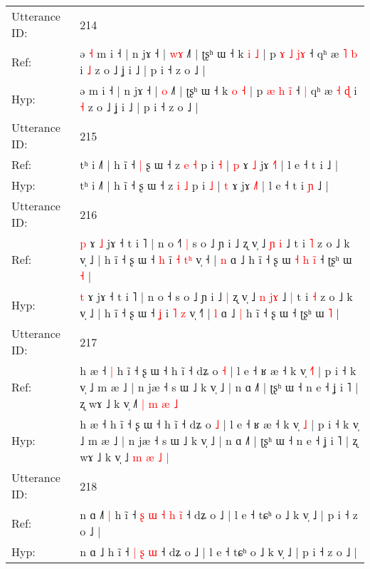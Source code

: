 \documentclass[10pt]{article}
\DeclareRobustCommand{\hl}[1]{{\textcolor{red}{#1}}}
\begin{document}
\begin{longtable}{ll}
 \\
\midrule
Utterance ID: & 214 \\
Ref: & ə\hl{ }\hl{˧} m i ˧ | n jɤ ˧ | \hl{w}\hl{ɤ} ˩˥ | ʈʂʰ ɯ ˧ k \hl{i} \hl{˩} | p \hl{ɤ} \hl{˩} \hl{j}\hl{ɤ} ˧\hl{}\hl{} qʰ æ \hl{˥} \hl{b} i \hl{˩} z o ˩ ʝ i ˩ | p i ˧ z o ˩ |
 \\
Hyp: & ə\hl{}\hl{} m i ˧ | n jɤ ˧ | \hl{}\hl{o} ˩˥ | ʈʂʰ ɯ ˧ k \hl{o} \hl{˧} | p \hl{æ} \hl{h} \hl{i}\hl{̃} ˧\hl{ }\hl{|} qʰ æ \hl{˧} \hl{ɖ} i \hl{˧} z o ˩ ʝ i ˩ | p i ˧ z o ˩ |
 \\
\midrule
Utterance ID: & 215 \\
Ref: & tʰ i ˩˥ | h ĩ ˧\hl{ }\hl{|} ʂ ɯ ˧ z \hl{e} \hl{˧} p i \hl{˧} | \hl{p} ɤ\hl{ }\hl{˩} jɤ \hl{˧}˥ | l e ˧ t i\hl{}\hl{} ˩ |
 \\
Hyp: & tʰ i ˩˥ | h ĩ ˧\hl{}\hl{} ʂ ɯ ˧ z \hl{i} \hl{˩} p i \hl{˩} | \hl{t} ɤ\hl{}\hl{} jɤ \hl{˩}˥ | l e ˧ t i\hl{ }\hl{ɲ} ˩ |
 \\
\midrule
Utterance ID: & 216 \\
Ref: & \hl{p} ɤ\hl{ }\hl{˩} jɤ ˧ t i ˥ | n o ˧\hl{˥}\hl{ }\hl{|} s o ˩ ɲ i ˩\hl{}\hl{} ʐ v̩ ˩ \hl{ɲ} \hl{}\hl{i} ˩\hl{}\hl{} t i \hl{˥} z o ˩ k v̩ ˩ | h ĩ ˧ ʂ ɯ ˧ \hl{h} i\hl{̃} \hl{˧} \hl{t}\hl{ʰ} v̩ ˧\hl{} | \hl{n} ɑ ˩\hl{}\hl{} h ĩ ˧ ʂ ɯ\hl{ }\hl{˧}\hl{ }\hl{h}\hl{ }\hl{i}\hl{̃} ˧ ʈʂʰ ɯ \hl{˧} |
 \\
Hyp: & \hl{t} ɤ\hl{}\hl{} jɤ ˧ t i ˥ | n o ˧\hl{}\hl{}\hl{} s o ˩ ɲ i ˩\hl{ }\hl{|} ʐ v̩ ˩ \hl{n} \hl{j}\hl{ɤ} ˩\hl{ }\hl{|} t i \hl{˧} z o ˩ k v̩ ˩ | h ĩ ˧ ʂ ɯ ˧ \hl{ʝ} i\hl{} \hl{˥} \hl{}\hl{z} v̩ ˧\hl{˥} | \hl{l} ɑ ˩\hl{ }\hl{|} h ĩ ˧ ʂ ɯ\hl{}\hl{}\hl{}\hl{}\hl{}\hl{}\hl{} ˧ ʈʂʰ ɯ \hl{˥} |
 \\
\midrule
Utterance ID: & 217 \\
Ref: & h æ ˧\hl{ }\hl{|} h ĩ ˧ ʂ ɯ ˧ h ĩ ˧ dʑ o \hl{˧} | l e ˧ ʁ æ ˧ k v̩ \hl{˧}\hl{˥} | p i ˧ k v̩ ˩ m æ ˩ | n jæ ˧ s ɯ ˩ k v̩ ˩ | n ɑ ˩˥ | ʈʂʰ ɯ ˧ n e ˧ ʝ i ˥ | ʐ wɤ ˩ k v̩ ˩\hl{˥} \hl{|} \hl{m} \hl{æ} \hl{˩}
 \\
Hyp: & h æ ˧\hl{}\hl{} h ĩ ˧ ʂ ɯ ˧ h ĩ ˧ dʑ o \hl{˩} | l e ˧ ʁ æ ˧ k v̩ \hl{}\hl{˩} | p i ˧ k v̩ ˩ m æ ˩ | n jæ ˧ s ɯ ˩ k v̩ ˩ | n ɑ ˩˥ | ʈʂʰ ɯ ˧ n e ˧ ʝ i ˥ | ʐ wɤ ˩ k v̩ ˩\hl{} \hl{m} \hl{æ} \hl{˩} \hl{|}
 \\
\midrule
Utterance ID: & 218 \\
Ref: & n ɑ ˩\hl{˥}\hl{ }\hl{|} h ĩ ˧\hl{ }\hl{ʂ}\hl{ }\hl{ɯ} \hl{˧} \hl{h} \hl{i}\hl{̃} ˧ dʑ o ˩ | l e ˧ tɕʰ o ˩ k v̩ ˩ | p i ˧ z o ˩ |
 \\
Hyp: & n ɑ ˩\hl{}\hl{}\hl{} h ĩ ˧\hl{}\hl{}\hl{}\hl{} \hl{|} \hl{ʂ} \hl{}\hl{ɯ} ˧ dʑ o ˩ | l e ˧ tɕʰ o ˩ k v̩ ˩ | p i ˧ z o ˩ |

\end{longtable}
\end{document}
